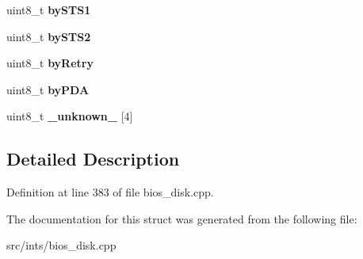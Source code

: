 \begin{DoxyCompactItemize}
\item 
\hypertarget{structNFDHDR__ENTRY_abec47658947ee28c2e4ca8c4dd4f8e67}{uint8\-\_\-t {\bfseries by\-S\-T\-S1}}\label{structNFDHDR__ENTRY_abec47658947ee28c2e4ca8c4dd4f8e67}

\item 
\hypertarget{structNFDHDR__ENTRY_a76165625648c61f101c79870a495fc2e}{uint8\-\_\-t {\bfseries by\-S\-T\-S2}}\label{structNFDHDR__ENTRY_a76165625648c61f101c79870a495fc2e}

\item 
\hypertarget{structNFDHDR__ENTRY_a47f3e2a7112f5459ec0eb59768949f3e}{uint8\-\_\-t {\bfseries by\-Retry}}\label{structNFDHDR__ENTRY_a47f3e2a7112f5459ec0eb59768949f3e}

\item 
\hypertarget{structNFDHDR__ENTRY_ac530386ff5d24cafbb8c6df6cbfb12d8}{uint8\-\_\-t {\bfseries by\-P\-D\-A}}\label{structNFDHDR__ENTRY_ac530386ff5d24cafbb8c6df6cbfb12d8}

\item 
\hypertarget{structNFDHDR__ENTRY_a2382030bc4ae46a87214367d4e8f978b}{uint8\-\_\-t {\bfseries \-\_\-unknown\-\_\-} \mbox{[}4\mbox{]}}\label{structNFDHDR__ENTRY_a2382030bc4ae46a87214367d4e8f978b}

\end{DoxyCompactItemize}


\subsection{Detailed Description}


Definition at line 383 of file bios\-\_\-disk.\-cpp.



The documentation for this struct was generated from the following file\-:\begin{DoxyCompactItemize}
\item 
src/ints/bios\-\_\-disk.\-cpp\end{DoxyCompactItemize}
